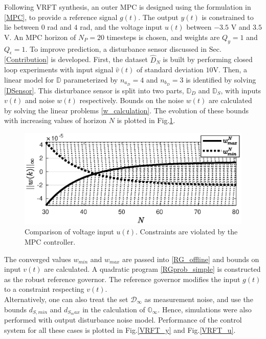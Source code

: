 \documentclass[letterpaper, 10 pt, conference]{ieeeconf}  %
\begin{document}
\begin{enumerate}
	Following VRFT synthesis, an outer MPC is designed using the formulation in \eqref{MPC}, to provide a reference signal $g(t)$. The output $y(t)$ is constrained to lie between $0$ rad and $4$ rad, and the voltage input $u(t)$ between $-3.5$ V and $3.5$ V. An MPC horizon of $N_P=20$ timesteps is chosen, and weights are $Q_y=1$ and $Q_{\epsilon}=1$. 
	To improve prediction, a disturbance sensor discussed in Sec.\ref{Contribution} is developed. First, the dataset $\hat{D}_N$ is built by performing closed loop experiments with input signal $\hat{v}(t)$ of standard deviation $10$V. Then, a linear model for $\mathbb{D}$ parameterized by $n_{a_D} = 4$ and $n_{b_D} = 3$ is identified by solving \eqref{DSensor}. This disturbance sensor is split into two parts, $\mathbb{D}_D$ and $\mathbb{D}_S$, with inputs $v(t)$ and noise $w(t)$ respectively. Bounds on the noise $w(t)$ are calculated by solving the linear problems \eqref{w_calculation}. The evolution of these bounds with increasing values of horizon $N$ is plotted in Fig.\ref{bounds_RG}.
	\begin{figure}[h]
		\includegraphics[scale = 0.65]{bounds_RG.eps}
		\caption{Comparison of voltage input $u(t)$. Constraints are violated by the MPC controller.}
		\label{bounds_RG}
	\end{figure}
	The converged values $w_{min}$ and $w_{max}$ are passed into \eqref{RG_offline} and bounds on input $v(t)$ are calculated. A quadratic program \eqref{RGprob_simple} is constructed as the robust reference governor. The reference governor modifies the input $g(t)$ to a constraint respecting $v(t)$. 
	\\
	Alternatively, one can also treat the set $\mathcal{D}_{\infty}$ as measurement noise, and use the bounds $d_{S,min}$ and $d_{S_max}$ in the calculation of $\mathbb{O}_{\infty}$. Hence, simulations were also performed with output disturbance noise model. 
	Performance of the control system for all these cases is plotted in Fig.\ref{VRFT_y} and Fig.\ref{VRFT_u}.
	\vspace{-10pt}

\end{enumerate}
\end{document}
